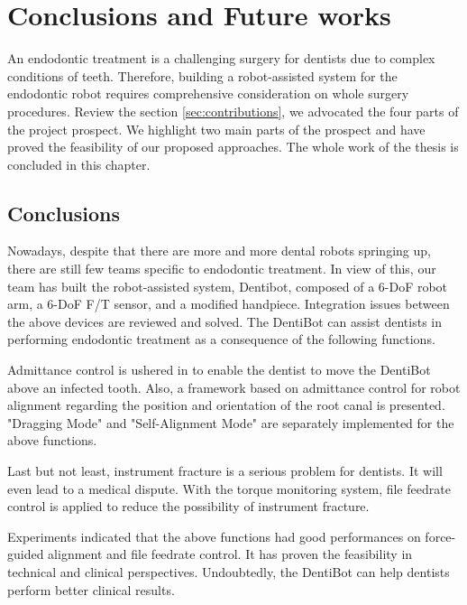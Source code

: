 \chapter{Conclusions and Future works}
\hspace*{6mm}An endodontic treatment is a challenging surgery for dentists due to complex conditions of teeth. Therefore, building a robot-assisted system for the endodontic robot requires comprehensive consideration on whole surgery procedures. Review the section \ref{sec:contributions}, we advocated the four parts of the project prospect. We highlight two main parts of the prospect and have proved the feasibility of our proposed approaches. The whole work of the thesis is concluded in this chapter.
\section{Conclusions}
\hspace*{6mm}Nowadays, despite that there are more and more dental robots springing up, there are still few teams specific to endodontic treatment. In view of this, our team has built the robot-assisted system, Dentibot, composed of a 6-DoF robot arm, a 6-DoF F/T sensor, and a modified handpiece. Integration issues between the above devices are reviewed and solved. The DentiBot can assist dentists in performing endodontic treatment as a consequence of the following functions. 
\par
Admittance control is ushered in to enable the dentist to move the DentiBot above an infected tooth. Also, a framework based on admittance control for robot alignment regarding the position and orientation of the root canal is presented. "Dragging Mode" and "Self-Alignment Mode" are separately implemented for the above functions.
\par
Last but not least, instrument fracture is a serious problem for dentists. It will even lead to a medical dispute. With the torque monitoring system, file feedrate control is applied to reduce the possibility of instrument fracture. 
\par
Experiments indicated that the above functions had good performances on force-guided alignment and file feedrate control. It has proven the feasibility in technical and clinical perspectives. Undoubtedly, the DentiBot can help dentists perform better clinical results.
